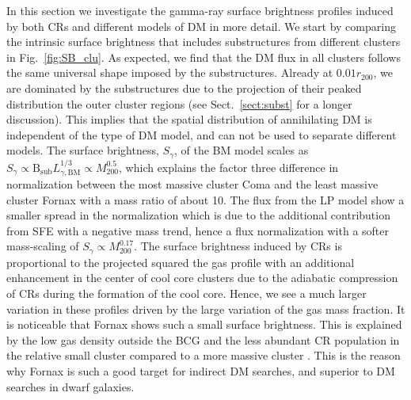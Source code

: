 \documentclass[10pt,aps,pra,reprint,amsmath,amsfonts,amssymb,showpacs,nofootinbib,floatfix]{revtex4-1}
\newcommand{\rmn}{\mathrm}
\newcommand{\B}{\rmn{B}}
\newcommand{\bsub}{\B_\rmn{sub}}
\newcommand{\rvir}{r_{200}}
\newcommand{\mvir}{M_{200}}
\begin{document}
In this section we investigate the gamma-ray surface brightness
profiles induced by both CRs and different models of DM in more
detail. We start by comparing the intrinsic surface brightness that
includes substructures from different clusters in
Fig.~\ref{fig:SB_clu}. As expected, we find that the DM flux in all
clusters follows the same universal shape imposed by the
substructures. Already at $0.01\rvir$, we are dominated by the
substructures due to the projection of their peaked distribution the
outer cluster regions (see Sect.~\ref{sect:subst} for a longer
discussion). This implies that the spatial distribution of
annihilating DM is independent of the type of DM model, and can not be
used to separate different models. The surface brightness, $S_\gamma$,
of the BM model scales as $S_\gamma\propto\bsub
L_{\gamma,\rmn{BM}}^{1/3} \propto \mvir^{0.5}$, which explains the
factor three difference in normalization between the most massive
cluster Coma and the least massive cluster Fornax with a mass ratio of
about 10. The flux from the LP model show a smaller spread in the
normalization which is due to the additional contribution from SFE
with a negative mass trend, hence a flux normalization with a softer
mass-scaling of $S_\gamma\propto\mvir^{0.17}$. The surface brightness
induced by CRs is proportional to the projected squared the gas
profile with an additional enhancement in the center of cool core
clusters due to the adiabatic compression of CRs during the formation
of the cool core. Hence, we see a much larger variation in these
profiles driven by the large variation of the gas mass fraction. It is
noticeable that Fornax shows such a small surface brightness. This is
explained by the low gas density outside the BCG and the less abundant
CR population in the relative small cluster compared to a more
massive cluster \cite{2010MNRAS.409..449P}.  This is the reason why
Fornax is such a good target for indirect DM searches, and superior
to DM searches in dwarf galaxies. 
\end{document}
